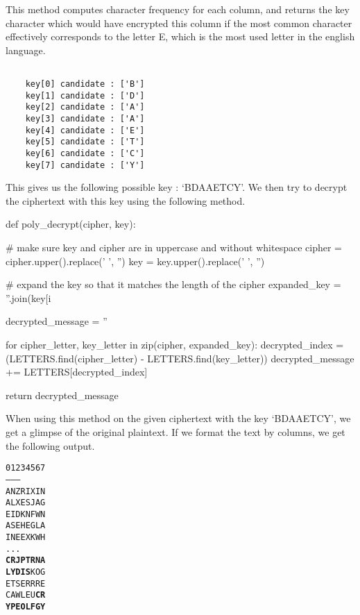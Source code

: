 \documentclass{article}
\begin{document}
This method computes character frequency for each column, and returns the key character which would have encrypted this column if the most common character effectively corresponds to the letter E, which is the most used letter in the english language.

\begin{verbatim}

    key[0] candidate : ['B']
    key[1] candidate : ['D']
    key[2] candidate : ['A']
    key[3] candidate : ['A']
    key[4] candidate : ['E']
    key[5] candidate : ['T']
    key[6] candidate : ['C']
    key[7] candidate : ['Y']

\end{verbatim}

This gives us the following possible key : `BDAAETCY'. We then try to decrypt the ciphertext with this key using the following method.

\bigskip
\begin{python}
def poly_decrypt(cipher, key):

    # make sure key and cipher are in uppercase and without whitespace
    cipher = cipher.upper().replace(' ', '')
    key = key.upper().replace(' ', '')

    # expand the key so that it matches the length of the cipher
    expanded_key = ''.join(key[i %

    decrypted_message = ''

    for cipher_letter, key_letter in zip(cipher, expanded_key):
        decrypted_index = (LETTERS.find(cipher_letter) - LETTERS.find(key_letter)) %
        decrypted_message += LETTERS[decrypted_index]

    return decrypted_message
\end{python}
\bigskip

When using this method on the given ciphertext with the key `BDAAETCY', we get a glimpse of the original plaintext. If we format the text by columns, we get the following output.


\begin{alltt}
    \begin{center}
        01234567
        --------
        ANZRIXIN
        ALXESJAG
        EIDKNFWN
        ASEHEGLA
        INEEXKWH
        ...
        \textbf{CRJPTRNA}
        \textbf{LYDIS}KOG
        ETSERRRE
        CAWLEU\textbf{CR}
        \textbf{YPEOLFGY}
    \end{center}
\end{alltt}
\end{document}
